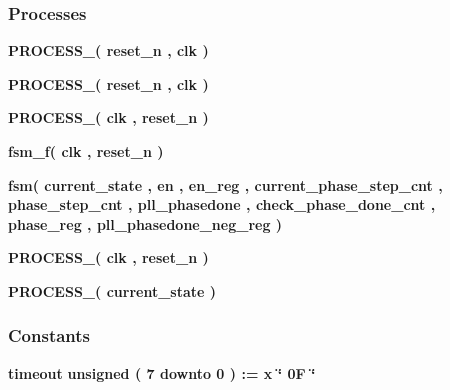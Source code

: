 \subsubsection*{Processes}
 \begin{DoxyCompactItemize}
\item 
{\bf P\+R\+O\+C\+E\+S\+S\+\_}{\bfseries  ( {\bfseries {\bfseries {\bf reset\+\_\+n}} \textcolor{vhdlchar}{ }} , {\bfseries {\bfseries {\bf clk}} \textcolor{vhdlchar}{ }} )}
\item 
{\bf P\+R\+O\+C\+E\+S\+S\+\_}{\bfseries  ( {\bfseries {\bfseries {\bf reset\+\_\+n}} \textcolor{vhdlchar}{ }} , {\bfseries {\bfseries {\bf clk}} \textcolor{vhdlchar}{ }} )}
\item 
{\bf P\+R\+O\+C\+E\+S\+S\+\_}{\bfseries  ( {\bfseries {\bfseries {\bf clk}} \textcolor{vhdlchar}{ }} , {\bfseries {\bfseries {\bf reset\+\_\+n}} \textcolor{vhdlchar}{ }} )}
\item 
{\bf fsm\+\_\+f}{\bfseries  ( {\bfseries {\bfseries {\bf clk}} \textcolor{vhdlchar}{ }} , {\bfseries {\bfseries {\bf reset\+\_\+n}} \textcolor{vhdlchar}{ }} )}
\item 
{\bf fsm}{\bfseries  ( {\bfseries {\bfseries {\bf current\+\_\+state}} \textcolor{vhdlchar}{ }} , {\bfseries {\bfseries {\bf en}} \textcolor{vhdlchar}{ }} , {\bfseries {\bfseries {\bf en\+\_\+reg}} \textcolor{vhdlchar}{ }} , {\bfseries {\bfseries {\bf current\+\_\+phase\+\_\+step\+\_\+cnt}} \textcolor{vhdlchar}{ }} , {\bfseries {\bfseries {\bf phase\+\_\+step\+\_\+cnt}} \textcolor{vhdlchar}{ }} , {\bfseries {\bfseries {\bf pll\+\_\+phasedone}} \textcolor{vhdlchar}{ }} , {\bfseries {\bfseries {\bf check\+\_\+phase\+\_\+done\+\_\+cnt}} \textcolor{vhdlchar}{ }} , {\bfseries {\bfseries {\bf phase\+\_\+reg}} \textcolor{vhdlchar}{ }} , {\bfseries {\bfseries {\bf pll\+\_\+phasedone\+\_\+neg\+\_\+reg}} \textcolor{vhdlchar}{ }} )}
\item 
{\bf P\+R\+O\+C\+E\+S\+S\+\_}{\bfseries  ( {\bfseries {\bfseries {\bf clk}} \textcolor{vhdlchar}{ }} , {\bfseries {\bfseries {\bf reset\+\_\+n}} \textcolor{vhdlchar}{ }} )}
\item 
{\bf P\+R\+O\+C\+E\+S\+S\+\_}{\bfseries  ( {\bfseries {\bfseries {\bf current\+\_\+state}} \textcolor{vhdlchar}{ }} )}
\end{DoxyCompactItemize}
\subsubsection*{Constants}
 \begin{DoxyCompactItemize}
\item 
{\bf timeout} {\bfseries \textcolor{comment}{unsigned}\textcolor{vhdlchar}{ }\textcolor{vhdlchar}{(}\textcolor{vhdlchar}{ }\textcolor{vhdlchar}{ } \textcolor{vhdldigit}{7} \textcolor{vhdlchar}{ }\textcolor{keywordflow}{downto}\textcolor{vhdlchar}{ }\textcolor{vhdlchar}{ } \textcolor{vhdldigit}{0} \textcolor{vhdlchar}{ }\textcolor{vhdlchar}{)}\textcolor{vhdlchar}{ }\textcolor{vhdlchar}{ }\textcolor{vhdlchar}{ }\textcolor{vhdlchar}{\+:}\textcolor{vhdlchar}{=}\textcolor{vhdlchar}{ }\textcolor{vhdlchar}{ }\textcolor{vhdlchar}{x}\textcolor{vhdlchar}{ }\textcolor{keyword}{\char`\"{} 0\+F \char`\"{}}\textcolor{vhdlchar}{ }} 
\end{DoxyCompactItemize}
